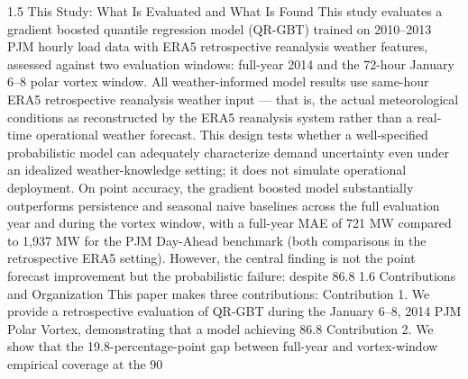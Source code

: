 1.5 This Study: What Is Evaluated and What Is Found
This study evaluates a gradient boosted quantile regression model (QR-GBT) trained on 2010–2013 PJM hourly load data with ERA5 retrospective reanalysis weather features, assessed against two evaluation windows: full-year 2014 and the 72-hour January 6–8 polar vortex window. All weather-informed model results use same-hour ERA5 retrospective reanalysis weather input — that is, the actual meteorological conditions as reconstructed by the ERA5 reanalysis system rather than a real-time operational weather forecast. This design tests whether a well-specified probabilistic model can adequately characterize demand uncertainty even under an idealized weather-knowledge setting; it does not simulate operational deployment. On point accuracy, the gradient boosted model substantially outperforms persistence and seasonal naive baselines across the full evaluation year and during the vortex window, with a full-year MAE of 721 MW compared to 1,937 MW for the PJM Day-Ahead benchmark (both comparisons in the retrospective ERA5 setting). However, the central finding is not the point forecast improvement but the probabilistic failure: despite 86.8%
1.6 Contributions and Organization
This paper makes three contributions:
Contribution 1. We provide a retrospective evaluation of QR-GBT during the January 6–8, 2014 PJM Polar Vortex, demonstrating that a model achieving 86.8%
Contribution 2. We show that the 19.8-percentage-point gap between full-year and vortex-window empirical coverage at the 90%
